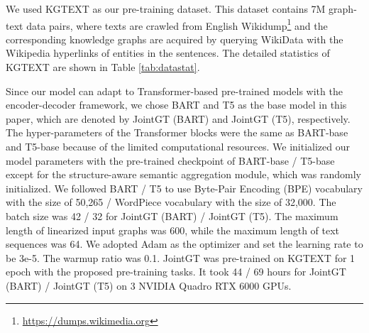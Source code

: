 \documentclass[11pt,a4paper]{article}
\begin{document}
We used KGTEXT \cite{chen2020kgpt} as our pre-training dataset. This dataset contains 7M graph-text data pairs, where texts are crawled from English Wikidump\footnote{\url{https://dumps.wikimedia.org}} and the corresponding knowledge graphs are acquired by querying WikiData with the Wikipedia hyperlinks of entities in the sentences. The detailed statistics of KGTEXT are shown in Table \ref{tab:datastat}.


\begin{table} [!htp]
\centering
\scriptsize
{}
\caption{Statistics of pre-training and fine-tuning datasets, including the total number of entities and relations, the data split, the average number of triples, and the average length of texts.}
\label{tab:datastat}
\end{table}


Since our model can adapt to Transformer-based pre-trained models with the encoder-decoder framework, we chose BART \cite{lewis2020bart} and T5 \cite{raffel2020t5} as the base model in this paper, which are denoted by JointGT (BART) and JointGT (T5), respectively. The hyper-parameters of the Transformer blocks were the same as BART-base and T5-base because of the limited computational resources. We initialized our model parameters with the pre-trained checkpoint of BART-base / T5-base except for the structure-aware semantic aggregation module, which was randomly initialized.
We followed BART / T5 to use Byte-Pair Encoding (BPE) vocabulary \cite{radford2019gpt2} with the size of 50,265 /  WordPiece vocabulary \cite{kudo2018sentencepiece} with the size of 32,000. The batch size was 42 / 32 for JointGT (BART) / JointGT (T5). The maximum length of linearized input graphs was 600, while the maximum length of text sequences was 64. We adopted Adam \cite{kingma2015adam} as the optimizer and set the learning rate to be 3e-5. The warmup ratio was 0.1. JointGT was pre-trained on KGTEXT for 1 epoch with the proposed pre-training tasks. It took 44 / 69 hours for JointGT (BART) / JointGT (T5) on 3 NVIDIA Quadro RTX 6000 GPUs.
\end{document}
